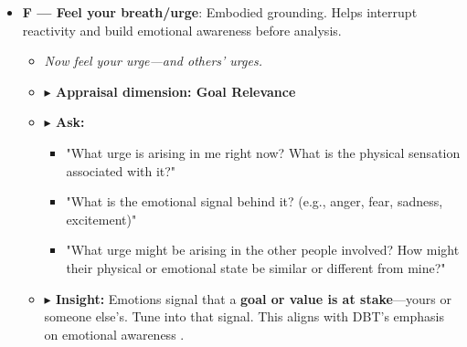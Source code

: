 \documentclass{article}
\begin{document}
\begin{itemize}[noitemsep,topsep=0pt]
    \item \textbf{F — Feel your breath/urge}: Embodied grounding. Helps interrupt reactivity and build emotional awareness before analysis.
    \begin{itemize}[noitemsep,topsep=0pt]
        \item \textit{Now feel your urge—and others' urges.}
        \item \textbf{$\blacktriangleright$ Appraisal dimension: Goal Relevance}
        \item \textbf{$\blacktriangleright$ Ask:}
        \begin{itemize}[noitemsep,topsep=0pt]
            \item "What urge is arising in me right now? What is the physical sensation associated with it?"
            \item "What is the emotional signal behind it? (e.g., anger, fear, sadness, excitement)"
            \item "What urge might be arising in the other people involved? How might their physical or emotional state be similar or different from mine?"
        \end{itemize}
        \item \textbf{$\blacktriangleright$ Insight:} Emotions signal that a \textbf{goal or value is at stake}—yours or someone else's. Tune into that signal. This aligns with DBT's emphasis on emotional awareness \cite{linehan1993cognitive}.
    \end{itemize}


\end{itemize}
\end{document}
